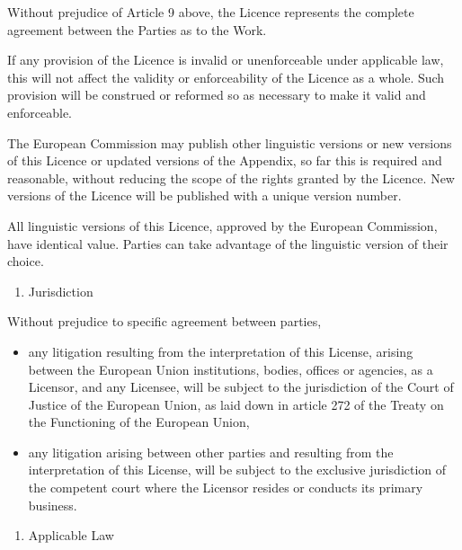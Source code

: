 \documentclass[letterpaper,10pt,english]{sphinxmanual}
\begin{document}
\sphinxAtStartPar
Without prejudice of Article 9 above, the Licence represents the complete
agreement between the Parties as to the Work.

\sphinxAtStartPar
If any provision of the Licence is invalid or unenforceable under applicable
law, this will not affect the validity or enforceability of the Licence as a
whole. Such provision will be construed or reformed so as necessary to make it
valid and enforceable.

\sphinxAtStartPar
The European Commission may publish other linguistic versions or new versions of
this Licence or updated versions of the Appendix, so far this is required and
reasonable, without reducing the scope of the rights granted by the Licence. New
versions of the Licence will be published with a unique version number.

\sphinxAtStartPar
All linguistic versions of this Licence, approved by the European Commission,
have identical value. Parties can take advantage of the linguistic version of
their choice.
\begin{enumerate}
%
\setcounter{enumi}{13}
\item {} 
\sphinxAtStartPar
Jurisdiction

\end{enumerate}

\sphinxAtStartPar
Without prejudice to specific agreement between parties,
\begin{itemize}
\item {} 
\sphinxAtStartPar
any litigation resulting from the interpretation of this License, arising
between the European Union institutions, bodies, offices or agencies, as a
Licensor, and any Licensee, will be subject to the jurisdiction of the Court
of Justice of the European Union, as laid down in article 272 of the Treaty on
the Functioning of the European Union,

\item {} 
\sphinxAtStartPar
any litigation arising between other parties and resulting from the
interpretation of this License, will be subject to the exclusive jurisdiction
of the competent court where the Licensor resides or conducts its primary
business.

\end{itemize}
\begin{enumerate}
%
\setcounter{enumi}{14}
\item {} 
\sphinxAtStartPar
Applicable Law

\end{enumerate}
\end{document}
